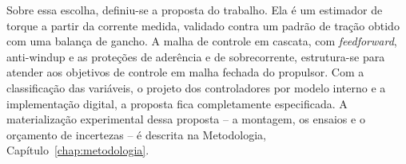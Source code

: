 Sobre essa escolha, definiu-se a proposta do trabalho. Ela é um estimador de torque a partir da
corrente medida, validado contra um padrão de tração obtido com uma balança de gancho.
A malha de controle em cascata, com \emph{feedforward}, anti-windup e as proteções de
aderência e de sobrecorrente, estrutura-se para atender aos objetivos de controle em
malha fechada do propulsor. Com a classificação das variáveis, o projeto dos
controladores por modelo interno e a implementação digital, a proposta fica completamente
especificada. A materialização experimental dessa proposta -- a montagem,
os ensaios e o orçamento de incertezas -- é descrita na Metodologia,
Capítulo~\ref{chap:metodologia}.

\clearpage
